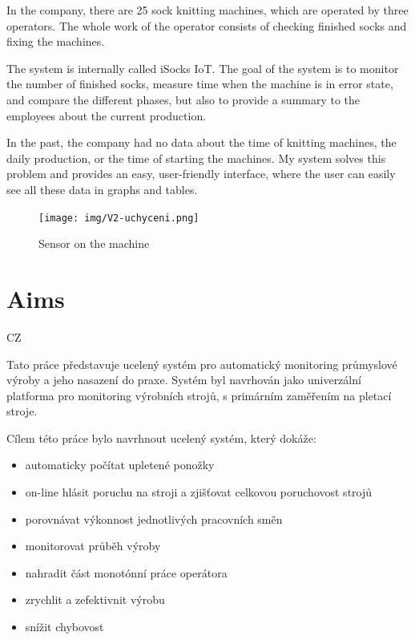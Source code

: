 \documentclass[12pt, a4paper]{article}
\begin{document}
In the company, there are 25 sock knitting machines, which are operated by three operators.
The whole work of the operator consists of checking finished socks and fixing the machines.

The system is internally called iSocks IoT.
The goal of the system is to monitor the number of finished socks, measure time when the machine is in error state, and compare the different phases, but also to provide a summary to the employees about the current production.

In the past, the company had no data about the time of knitting machines, the daily production, or the time of starting the machines.
My system solves this problem and provides an easy, user-friendly interface, where the user can easily see all these data in graphs and tables.

\newpage

\begin{figure}[t]
    \centering
    \texttt{[image: img/V2-uchyceni.png]}
    \caption{Sensor on the machine}
    \label{fig:SenzorNaStroji}
\end{figure}


\section*{Aims}
CZ

Tato práce představuje ucelený systém pro automatický monitoring průmyslové výroby a jeho nasazení do praxe.
Systém byl navrhován jako univerzální platforma pro monitoring výrobních strojů, s primárním zaměřením na pletací stroje.

Cílem této práce bylo navrhnout ucelený systém, který dokáže:

\begin{itemize}
    \item automaticky počítat upletené ponožky
    \item on-line hlásit poruchu na stroji a zjišťovat celkovou poruchovost strojů
    \item porovnávat výkonnost jednotlivých pracovních směn
    \item monitorovat průběh výroby
    \item nahradit část monotónní práce operátora
    \item zrychlit a zefektivnit výrobu
    \item snížit chybovost
\end{itemize}
\end{document}
